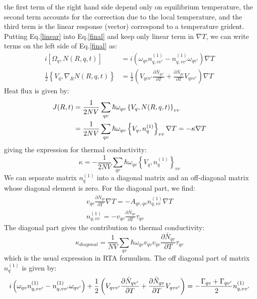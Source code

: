 \documentclass{article}
\begin{document}
the first term of the right hand side depend only on equilibrium temperature, the second term accounts for the correction 
due to the local temperature, and the third term is the linear response (vector) correspond to a temperature grident.
Putting Eq.\ref{linear} into Eq.\ref{final} and keep only linear term in $\nabla T$, we can write terms on the left side of Eq.\ref{final} as:
\begin{align}
    i \left[ \Omega_{q},N(R,q,t) \right] &= i \left( \omega_{qv} n^{(1)}_{q,vv'} - n^{(1)}_{q,vv'} \omega_{qv'} \right) \nabla T \\
    \frac{1}{2} \left\{ V_{q}, \nabla_R N(R,q,t) \right\} &= 
            \frac{1}{2} \left( V_{qvv'} \frac{\partial \bar{N}_{qv'}}{\partial T} + \frac{\partial \bar{N}_{qv}}{\partial T} V_{qvv'} \right) \nabla T
\end{align}
Heat flux is given by:
\begin{align}
    J(R,t) &= \frac{1}{2NV} \sum_{qv} \hbar \omega_{qv} \left\{ V_q, N(R,q,t)  \right\}_{vv} \notag \\
           &= \frac{1}{2NV} \sum_{qv} \hbar \omega_{qv} \left\{ V_q, n^{(1)}_{q}  \right\}_{vv}\nabla T = - \kappa \nabla T
\end{align}
giving the expression for thermal conductivity:
\begin{equation}
    \kappa = - \frac{1}{2NV} \sum_{qv} \hbar \omega_{qv} \left\{ V_q, n^{(1)}_{q}  \right\}_{vv}
\end{equation}
We can separate matrix $n^{(1)}_{q}$ into a diagonal matrix and an off-diagonal matrix whose diagonal element is zero. 
For the diagonal part, we find:
\begin{gather}
    v_{qv} \frac{\partial \bar{N}_{qv}}{\partial T} \nabla T = - A_{qv,qv} n^{(1)}_{q,vv} \nabla T \\
    n^{(1)}_{q,vv} = - v_{qv} \frac{\partial \bar{N}_{qv}}{\partial T} \tau_{qv}
\end{gather}
The diagonal part gives the contribution to thermal conductivity:
\begin{equation}
    \kappa_{diagonal} = \frac{1}{NV} \sum_{qv} \hbar \omega_{qv} v_{qv} v_{qv} \frac{\partial \bar{N}_{qv}}{\partial T} \tau_{qv}
\end{equation}
which is the usual expression in RTA formulism. The off diagonal part of matrix $n^{(1)}_{q}$ is given by:
\begin{gather}
    i \left( \omega_{qv} n^{(1)}_{q,vv'} - n^{(1)}_{q,vv'} \omega_{qv'} \right) 
    + \frac{1}{2} \left( V_{qvv'} \frac{\partial \bar{N}_{qv'}}{\partial T} + \frac{\partial \bar{N}_{qv}}{\partial T} V_{qvv'} \right)
    = - \frac{\Gamma_{qv}+ \Gamma_{qv'}}{2} n^{(1)}_{q,vv'} \notag 
\end{gather}
\end{document}
